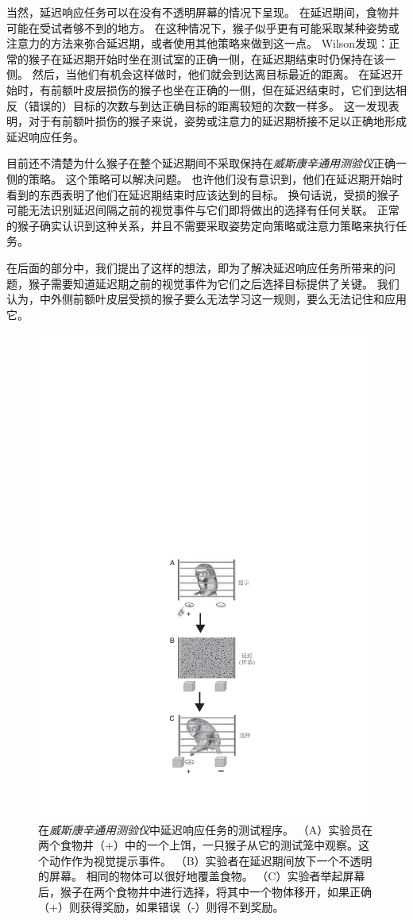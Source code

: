 当然，延迟响应任务可以在没有不透明屏幕的情况下呈现。
在延迟期间，食物井可能在受试者够不到的地方。
在这种情况下，猴子似乎更有可能采取某种姿势或注意力的方法来弥合延迟期，或者使用其他策略来做到这一点。
Wilson\cite{wilson1963effect}发现：正常的猴子在延迟期开始时坐在测试室的正确一侧，在延迟期结束时仍保持在该一侧。
然后，当他们有机会这样做时，他们就会到达离目标最近的距离。
在延迟开始时，有前额叶皮层损伤的猴子也坐在正确的一侧，但在延迟结束时，它们到达相反（错误的）目标的次数与到达正确目标的距离较短的次数一样多。
这一发现表明，对于有前额叶损伤的猴子来说，姿势或注意力的延迟期桥接不足以正确地形成延迟响应任务。


目前还不清楚为什么猴子在整个延迟期间不采取保持在\textit{威斯康辛通用测验仪}正确一侧的策略。
这个策略可以解决问题。
也许他们没有意识到，他们在延迟期开始时看到的东西表明了他们在延迟期结束时应该达到的目标。
换句话说，受损的猴子可能无法识别延迟间隔之前的视觉事件与它们即将做出的选择有任何关联。
正常的猴子确实认识到这种关系，并且不需要采取姿势定向策略或注意力策略来执行任务。


在后面的部分中，我们提出了这样的想法，即为了解决延迟响应任务所带来的问题，猴子需要知道延迟期之前的视觉事件为它们之后选择目标提供了关键。
我们认为，中外侧前额叶皮层受损的猴子要么无法学习这一规则，要么无法记住和应用它。


\begin{figure}
	\centering
	\includegraphics[width=0.32\linewidth]{chap6/6_3}
	\caption{在\textit{威斯康辛通用测验仪}中延迟响应任务的测试程序。
		（A）实验员在两个食物井（+）中的一个上饵，一只猴子从它的测试笼中观察。这个动作作为视觉提示事件。
		（B）实验者在延迟期间放下一个不透明的屏幕。
		相同的物体可以很好地覆盖食物。
		（C）实验者举起屏幕后，猴子在两个食物井中进行选择，将其中一个物体移开，如果正确（+）则获得奖励，如果错误（-）则得不到奖励\cite{murray1991contributions}。}
	\label{fig:6_3}
\end{figure}



